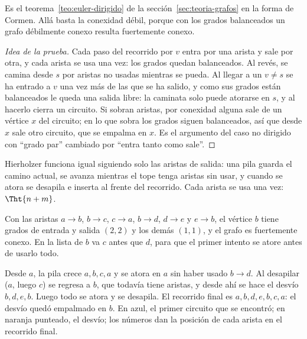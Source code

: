 \documentclass[11pt,letterpaper]{article}
\begin{document}
Es el teorema~\ref{teo:euler-dirigido} de la
sección~\ref{sec:teoria-grafos} en la forma de Cormen. Allá basta la
conexidad débil, porque con los grados balanceados un grafo débilmente
conexo resulta fuertemente conexo.

\begin{proof}[Idea de la prueba]
  Cada paso del recorrido por $v$ entra por una arista y sale por otra,
  y cada arista se usa una vez: los grados quedan balanceados. Al
  revés, se camina desde $s$ por aristas no usadas mientras se pueda.
  Al llegar a un $v \neq s$ se ha entrado a $v$ una vez más de las que
  se ha salido, y como sus grados están balanceados le queda una salida
  libre: la caminata solo puede atorarse en $s$, y al hacerlo cierra un
  circuito. Si sobran aristas, por conexidad alguna sale de un vértice
  $x$ del circuito; en lo que sobra los grados siguen balanceados, así
  que desde $x$ sale otro circuito, que se empalma en $x$. Es el
  argumento del caso no dirigido con ``grado par'' cambiado por
  ``entra tanto como sale''.
\end{proof}

Hierholzer funciona igual siguiendo solo las aristas de salida: una
pila guarda el camino actual, se avanza mientras el tope tenga aristas
sin usar, y cuando se atora se desapila e inserta al frente del
recorrido. Cada arista se usa una vez: $\Tht{n + m}$.

\begin{ejemplo}[Un empalme]
  \label{ej:euler-dirigido}
  Con las aristas $a \to b$, $b \to c$, $c \to a$, $b \to d$,
  $d \to e$ y $e \to b$, el vértice $b$ tiene grados de entrada y
  salida $(2, 2)$ y los demás $(1, 1)$, y el grafo es fuertemente
  conexo. En la lista de $b$ va $c$ antes que $d$, para que el primer
  intento se atore antes de usarlo todo.
  \begin{center}
  \end{center}
  Desde $a$, la pila crece $a, b, c, a$ y se atora en $a$ sin haber
  usado $b \to d$. Al desapilar ($a$, luego $c$) se regresa a $b$, que
  todavía tiene aristas, y desde ahí se hace el desvío $b, d, e, b$.
  Luego todo se atora y se desapila. El recorrido final es
  $a, b, d, e, b, c, a$: el desvío quedó empalmado en $b$. En azul, el
  primer circuito que se encontró; en naranja punteado, el desvío; los
  números dan la posición de cada arista en el recorrido final.
\end{ejemplo}
\end{document}
